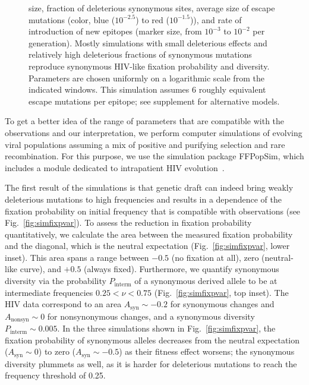\documentclass[rmp, twocolumn]{revtex4}
\newcommand{\FIG}[1]{Fig.~\ref{fig:#1}}
\begin{document}
\begin{figure}
\begin{center}
{size, fraction of deleterious synonymous sites, average size of escape
mutations (color, blue ($10^{-2.5}$) to red ($10^{-1.5}$)), and rate of
introduction of new epitopes (marker size, from $10^{-3}$ to $10^{-2}$ per
generation). Mostly simulations with small deleterious effects and relatively
high deleterious fractions of synonymous mutations reproduce synonymous HIV-like
fixation probability and diversity. Parameters are chosen uniformly on a
logarithmic scale from the indicated windows. This simulation assumes 6
roughly equivalent escape mutations per epitope; see supplement for alternative
models. }
\label{fig:simheat}
\end{center}
\end{figure}

To get a better idea of the range of parameters that are compatible with the
observations and our interpretation, we perform computer simulations of
evolving viral populations assuming a mix of positive and purifying selection
and rare recombination.
For this purpose, we use the simulation package FFPopSim, which includes a
module dedicated to intrapatient HIV evolution~\citep{zanini_ffpopsim:_2012}. 

The first result of the simulations is that genetic draft can indeed bring weakly
deleterious mutations to high frequencies and results in a dependence of the
fixation probability on initial frequency that is compatible with observations
(see \FIG{simfixpvar}).
To assess the reduction in fixation probability quantitatively, we calculate
the area between the measured fixation probability and the diagonal, which is
the neutral expectation (\FIG{simfixpvar}, lower inset). This area spans a range
between $-0.5$ (no fixation at all), zero (neutral-like curve), and $+0.5$ (always
fixed). Furthermore, we quantify synonymous diversity via the probability
$P_\text{interm}$ of a synonymous derived allele to be at intermediate frequencies
$0.25 < \nu < 0.75$ (\FIG{simfixpvar}, top inset).
The HIV data correspond to an area $A_\text{syn} \sim -0.2$  for synonymous
changes and $A_\text{nonsyn} \sim 0$ for nonsynonymous changes,
and a synonymous diversity $P_\text{interm} \sim 0.005$.
In the three simulations shown in \FIG{simfixpvar}, the fixation probability of
synonymous alleles decreases from the neutral expectation ($A_\text{syn} \sim 0$) to zero
($A_\text{syn} \sim -0.5$) as their fitness effect
worsens; the synonymous diversity plummets as well, as it is harder for
deleterious mutations to reach the frequency threshold of 0.25.
\end{document}

